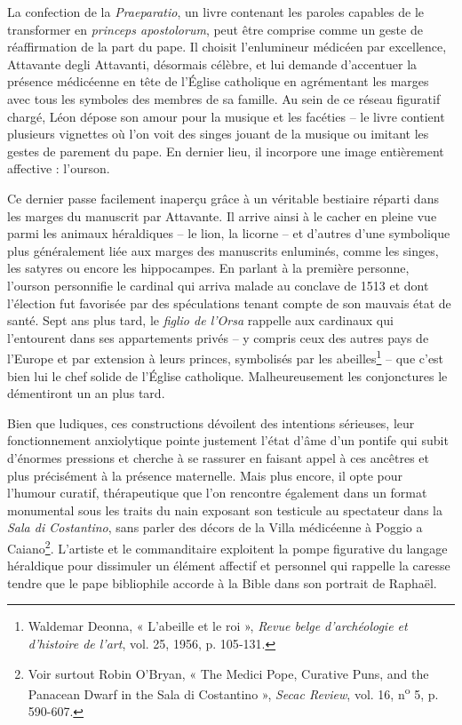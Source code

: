 \documentclass[12pt,twoside,openany]{book}
\begin{document}
La confection de la \textit{Praeparatio}, un livre contenant les paroles capables de le transformer en \textit{princeps apostolorum}, peut être comprise comme un geste de réaffirmation de la part du pape. Il choisit l’enlumineur médicéen par excellence, Attavante degli Attavanti, désormais célèbre, et lui demande d’accentuer la présence médicéenne en tête de l’Église catholique en agrémentant les marges avec tous les symboles des membres de sa famille. Au sein de ce réseau figuratif chargé, Léon dépose son amour pour la musique et les facéties – le livre contient plusieurs vignettes où l’on voit des singes jouant de la musique ou imitant les gestes de parement du pape. En dernier lieu, il incorpore une image entièrement affective : l’ourson.

Ce dernier passe facilement inaperçu grâce à un véritable bestiaire réparti dans les marges du manuscrit par Attavante. Il arrive ainsi à le cacher en pleine vue parmi les animaux héraldiques – le lion, la licorne – et d’autres d’une symbolique plus généralement liée aux marges des manuscrits enluminés, comme les singes, les satyres ou encore les hippocampes. En parlant à la première personne, l’ourson personnifie le cardinal qui arriva malade au conclave de 1513 et dont l’élection fut favorisée par des spéculations tenant compte de son mauvais état de santé. Sept ans plus tard, le \textit{figlio de l’Orsa }rappelle aux cardinaux qui l’entourent dans ses appartements privés – y compris ceux des autres pays de l’Europe et par extension à leurs princes, symbolisés par les abeilles\footnote{Waldemar Deonna, « L’abeille et le roi », \textit{Revue belge d’archéologie et d’histoire de l’art}, vol. 25, 1956, p. 105‑131.} – que c’est bien lui le chef solide de l’Église catholique. Malheureusement les conjonctures le démentiront un an plus tard.

Bien que ludiques, ces constructions dévoilent des intentions sérieuses, leur fonctionnement anxiolytique pointe justement l’état d’âme d’un pontife qui subit d’énormes pressions et cherche à se rassurer en faisant appel à ces ancêtres et plus précisément à la présence maternelle. Mais plus encore, il opte pour l’humour curatif, thérapeutique que l’on rencontre également dans un format monumental sous les traits du nain exposant son testicule au spectateur dans la \textit{Sala di Costantino}, sans parler des décors de la Villa médicéenne à Poggio a Caiano\footnote{Voir surtout Robin O’Bryan, « The Medici Pope, Curative Puns, and the Panacean Dwarf in the Sala di Costantino », \textit{Secac Review}, vol. 16, n\textsuperscript{o} 5, p. 590-607.}. L’artiste et le commanditaire exploitent la pompe figurative du langage héraldique pour dissimuler un élément affectif et personnel qui rappelle la caresse tendre que le pape bibliophile accorde à la Bible dans son portrait de Raphaël.
\end{document}
